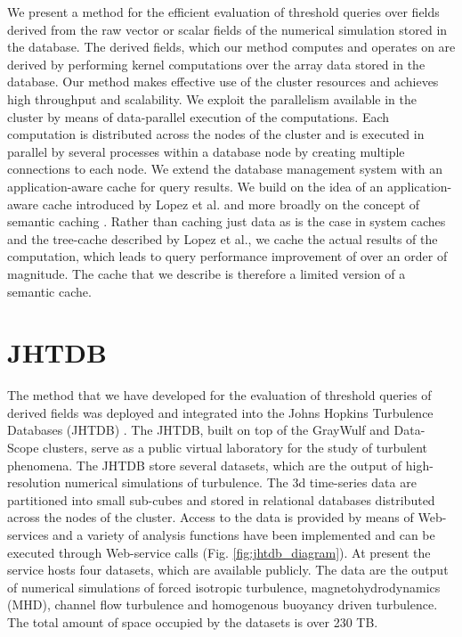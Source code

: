 \documentclass{sig-alternate}
\begin{document}
We present a method for the efficient evaluation of threshold queries over fields derived from the raw vector or scalar fields of the numerical simulation 
stored in the database. The derived fields, which our method computes and operates on are derived by performing kernel computations over the array data 
stored in the database.
Our method makes effective use of the cluster resources and achieves high throughput and scalability. 
We exploit the parallelism 
available in the cluster by means of data-parallel execution of the computations. Each computation is distributed across the nodes of the cluster and
is executed in parallel by several processes within a database node by creating multiple connections to each node. We extend the database management
system with an
application-aware cache for query results. We build on the idea of an application-aware cache introduced by Lopez et al. \cite{Lopez} and more broadly 
on the concept of semantic caching \cite{Ren}. Rather than caching just data as is the case in system caches and the tree-cache described by Lopez et al.,
we cache the actual results of the computation, which leads to query performance improvement of over an order of magnitude.
The cache that we describe is therefore a limited version of a semantic cache.


\section{JHTDB}\label{jhtdb}

The method that we have developed for the evaluation of threshold queries of derived fields was deployed and integrated into the 
Johns Hopkins Turbulence Databases (JHTDB) \cite{Yi, Perlman}. The JHTDB, built on top of the GrayWulf and Data-Scope clusters, serve as a public
virtual laboratory for
the study of turbulent phenomena. The JHTDB store several datasets, which are the output of high-resolution numerical simulations of turbulence.
The 3d time-series data are partitioned into small sub-cubes and stored in relational databases distributed across the nodes of the cluster.
Access to the data is provided by means of Web-services and a variety of analysis functions have been
implemented and can be executed through Web-service calls (Fig. \ref{fig:jhtdb_diagram}).
At present the service hosts four datasets, which are available publicly. 
The data are the output of numerical simulations of forced isotropic turbulence, magnetohydrodynamics (MHD), channel 
flow turbulence and homogenous buoyancy driven turbulence.
The total amount of space occupied by the datasets is over 230 TB. 
\end{document}
